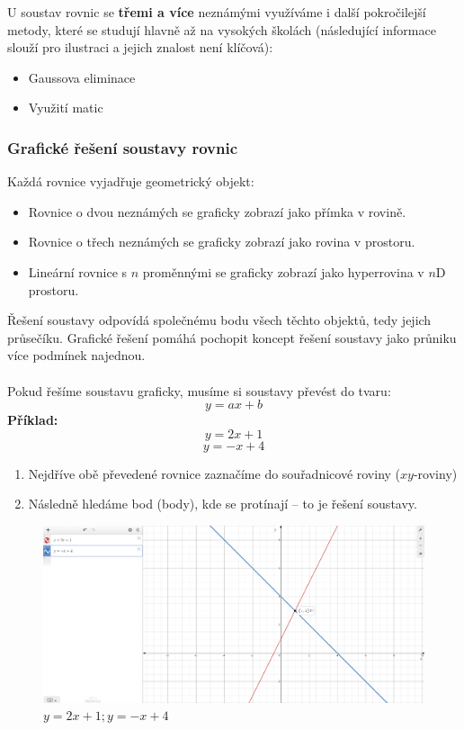 U soustav rovnic se \textbf{třemi a více} neznámými využíváme i další pokročilejší metody, které se studují hlavně až na vysokých školách (následující informace slouží pro ilustraci a jejich znalost není klíčová):
\begin{itemize}
    \item Gaussova eliminace
    \item Využití matic
\end{itemize}

        \subsubsection{Grafické řešení soustavy rovnic}
Každá rovnice vyjadřuje geometrický objekt:
\begin{itemize}
    \item Rovnice o dvou neznámých se graficky zobrazí jako přímka v rovině.
    \item Rovnice o třech neznámých se graficky zobrazí jako rovina v prostoru.
    \item Lineární rovnice s $n$ proměnnými se graficky zobrazí jako hyperrovina v $n$D prostoru.
\end{itemize}
Řešení soustavy odpovídá společnému bodu všech těchto objektů, tedy jejich průsečíku.
Grafické řešení pomáhá pochopit koncept řešení soustavy jako průniku více podmínek najednou.\\\\
Pokud řešíme soustavu graficky, musíme si soustavy převést do tvaru:
$$
y=ax+b
$$
\textbf{Příklad:}
$$
y=2x+1
$$
$$
y=-x+4
$$
\begin{enumerate}
    \item Nejdříve obě převedené rovnice zaznačíme do souřadnicové roviny ($xy$-roviny)
    \item Následně hledáme bod (body), kde se protínají – to je řešení soustavy.
\end{enumerate}
\begin{figure}[H]
        \centering
        \includegraphics[width=0.5\linewidth]{img/4_soustava linearnich rovnic o dvou neznamych.png}
        \caption{$y=2x+1;y=-x+4$} 
        \label{fig:enter-label}
    \end{figure}
    
